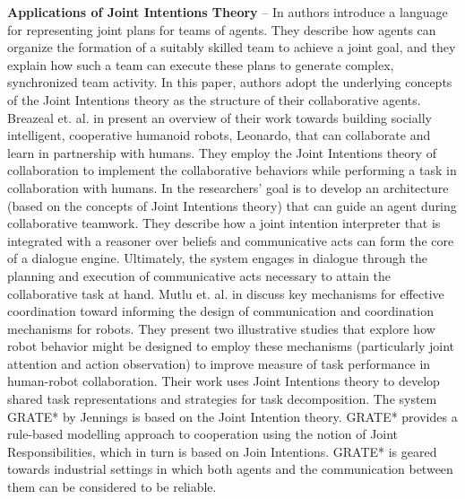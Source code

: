 \documentclass[12pt]{report}
\begin{document}
\textbf{Applications of Joint Intentions Theory} -- In \cite{kinny:planned-team}
authors introduce a language for representing joint plans for teams of agents.
They describe how agents can organize the formation of a suitably skilled team
to achieve a joint goal, and they explain how such a team can execute these
plans to generate complex, synchronized team activity. In this paper, authors
adopt the underlying concepts of the Joint Intentions theory as the structure of
their collaborative agents. Breazeal et. al. in \cite{breazeal:humanoid-robots}
present an overview of their work towards building socially intelligent,
cooperative humanoid robots, Leonardo, that can collaborate and learn in
partnership with humans. They employ the Joint Intentions theory of
collaboration to implement the collaborative behaviors while performing a task
in collaboration with humans. In \cite{subramanian:joint-intention-dialogue}
the researchers' goal is to develop an architecture (based on the concepts of
Joint Intentions theory) that can guide an agent during collaborative teamwork.
They describe how a joint intention interpreter that is integrated with a
reasoner over beliefs and communicative acts can form the core of a dialogue
engine. Ultimately, the system engages in dialogue through the planning and
execution of communicative acts necessary to attain the collaborative task at
hand. Mutlu et. al. in \cite{mutlu:coordination-robot} discuss key mechanisms
for effective coordination toward informing the design of communication and
coordination mechanisms for robots. They present two illustrative studies that
explore how robot behavior might be designed to employ these mechanisms
(particularly joint attention and action observation) to improve measure of task
performance in human-robot collaboration. Their work uses Joint Intentions
theory to develop shared task representations and strategies for task
decomposition. The system GRATE* by Jennings
\cite{jennings:joint-intention-hybrid} is based on the Joint Intention theory.
GRATE* provides a rule-based modelling approach to cooperation using the notion
of Joint Responsibilities, which in turn is based on Join Intentions. GRATE* is
geared towards industrial settings in which both agents and the communication
between them can be considered to be reliable.\\
\end{document}
